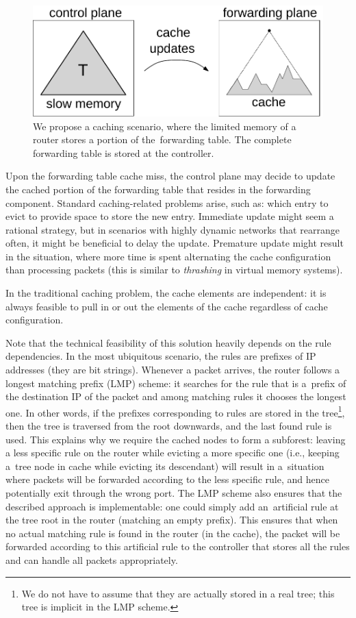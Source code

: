 \begin{figure}[t]
\centering
\includegraphics[width=0.5\columnwidth]{figs/router5.pdf}
\caption{We propose a caching scenario, where the limited memory of a router stores a portion of the~forwarding table. The complete forwarding table is stored at the controller.}\label{fig:router}
\end{figure}




Upon the forwarding table cache miss, the control plane may decide to update the cached portion of the forwarding table that resides in the forwarding component.
Standard caching-related problems arise, such as: which entry to evict to provide space to store the new entry.
Immediate update might seem a rational strategy, but in scenarios with highly dynamic networks that rearrange often, it might be beneficial to delay the update.
Premature update might result in the situation, where more time is spent alternating the cache configuration than processing packets (this is similar to \emph{thrashing} in virtual memory systems).

In the traditional caching problem, the cache elements are independent: it is always feasible to pull in or out the elements of the cache regardless of cache configuration.

Note that the technical feasibility of this solution heavily depends on the
rule dependencies. In the most ubiquitous scenario, the rules are prefixes of
IP addresses (they are bit strings). Whenever a packet arrives, the router
follows a longest matching prefix (LMP) scheme: it searches for the rule that
is a~prefix of the destination IP of the packet and among matching rules it
chooses the longest one. In other words, if the prefixes corresponding to
rules are stored in the tree\footnote{We do not have to assume that they are
actually stored in a real tree; this tree is implicit in the LMP scheme.},
then the tree is traversed from the root downwards, and the last found rule is
used. This explains why we require the cached nodes to form a subforest:
leaving a less specific rule on the router while evicting a more specific one
(i.e., keeping a~tree node in cache while evicting its descendant) will result
in a~situation where packets will be forwarded according to the less specific
rule, and hence potentially exit through the wrong port. The LMP scheme also
ensures that the described approach is implementable: one could simply add
an~artificial rule at the tree root in the router (matching an empty prefix).
This ensures that when no actual matching rule is found in the router (in the
cache), the packet will be forwarded according to this artificial rule to the
controller that stores all the rules and can handle all packets appropriately.

